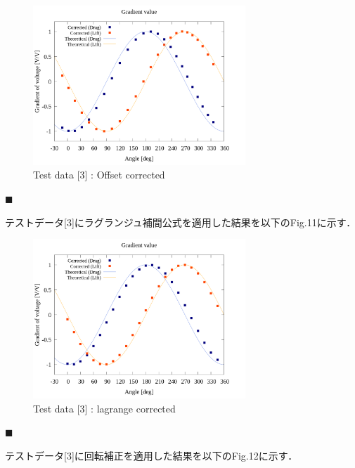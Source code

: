 \documentclass[twocolumn,a4j]{jsarticle}
\begin{document}
\begin{figure}[htbp]
    \begin{center}
        \includegraphics[width=80mm]{../../../02_workspace/result/simulation_tx=10.0_ty=-5.0_dx=5.00_dy=-2.50/plot/21/21-2_summary_offset.png}
        \caption{Test data [3] : Offset corrected}
    \end{center}
\end{figure}

\newpage

\noindent $\blacksquare$ 

テストデータ[3]にラグランジュ補間公式を適用した結果を以下のFig.11に示す．

\begin{figure}[htbp]
    \begin{center}
        \includegraphics[width=80mm]{../../../02_workspace/result/simulation_tx=10.0_ty=-5.0_dx=5.00_dy=-2.50/plot/21/21-3_summary_interpolated.png}
        \caption{Test data [3] : lagrange corrected}
    \end{center}
\end{figure}

\noindent $\blacksquare$ 

テストデータ[3]に回転補正を適用した結果を以下のFig.12に示す．
\end{document}
